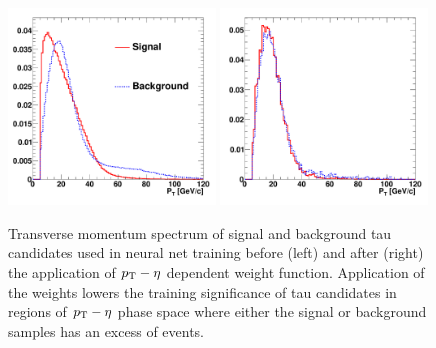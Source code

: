 \begin{figure}[thbp]
\setlength{\unitlength}{1mm}
\begin{center}
\includegraphics*[width=0.49\textwidth]{tanc_chapter/figures/training_weights_unweighted.pdf}
\includegraphics*[width=0.49\textwidth]{tanc_chapter/figures/training_weights_weighted.pdf}
\caption[Kinematic weighting of training sample]{Transverse momentum spectrum of
signal and background tau candidates used in neural net training before (left)
and after (right) the application of \mbox{$p_{\mathrm{T}}-\eta$} dependent weight function.
Application of the weights lowers the training significance of tau candidates
in regions of \mbox{$p_{\mathrm{T}}-\eta$} phase space where either the signal or background
samples has an excess of events. } \label{fig:nnTrainingWeights}
\end{center}
\end{figure} 

